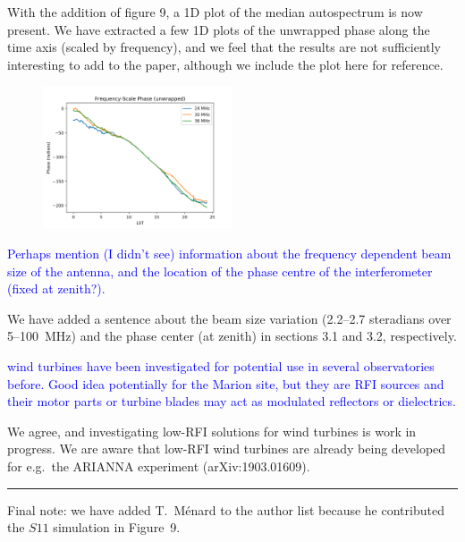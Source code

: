 \documentclass[11pt]{article}
\begin{document}
With the addition of figure 9, a 1D plot of the median autospectrum is
now present.  We have extracted a few 1D plots of the unwrapped phase
along the time axis (scaled by frequency), and we feel that the
results are not sufficiently interesting to add to the paper, although
we include the plot here for reference.
\begin{figure}[h]
  \vspace{-5pt}
  \begin{center}
    \includegraphics*[angle=0,width=0.5\textwidth]{Figures/unwrapped_phase_3freq.png}
  \end{center}
  \vspace{-5pt}
\end{figure}

\pagebreak

\noindent \textcolor{blue}{Perhaps mention (I didn't see) information
  about the frequency dependent beam size of the antenna, and the
  location of the phase centre of the interferometer (fixed at
  zenith?).}

We have added a sentence about the beam size variation (2.2--2.7
steradians over 5--100~MHz) and the phase center (at zenith) in
sections 3.1 and 3.2, respectively.

\noindent \textcolor{blue}{wind turbines have been investigated for
  potential use in several observatories before. Good idea potentially
  for the Marion site, but they are RFI sources and their motor parts
  or turbine blades may act as modulated reflectors or dielectrics.}

We agree, and investigating low-RFI solutions for wind turbines is
work in progress.  We are aware that low-RFI wind turbines are already
being developed for e.g.\ the ARIANNA experiment (arXiv:1903.01609).

\noindent\rule{\textwidth}{0.7pt}

Final note: we have added T.~M\'enard to the author list because he
contributed the $S11$ simulation in Figure~9.
\end{document}
